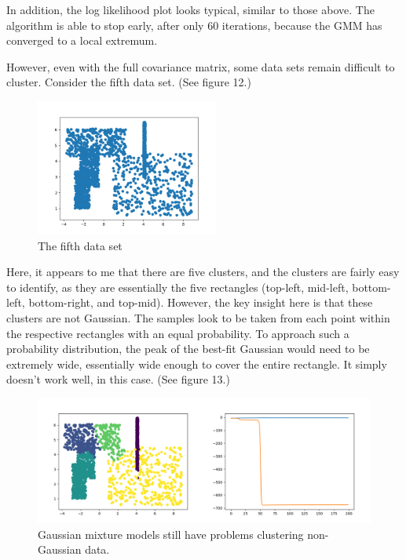 \documentclass{article}
\begin{document}
In addition, the log likelihood plot looks typical, similar to those above. The 
algorithm is able to stop early, after only 60 iterations, because the GMM has 
converged to a local extremum.

However, even with the full covariance matrix, some data sets remain difficult 
to cluster. Consider the fifth data set. (See figure 12.)

\begin{figure}[!ht]
	\centering
	\includegraphics[width=60mm]{figs/gmm_ds4_kn_input.png}
	\caption{The fifth data set}
\end{figure}

Here, it appears to me that there are five clusters, and the clusters are fairly 
easy to identify, as they are essentially the five rectangles (top-left, 
mid-left, bottom-left, bottom-right, and top-mid). However, the key insight here 
is that these clusters are not Gaussian. The samples look to be taken from each 
point within the respective rectangles with an equal probability. To approach 
such a probability distribution, the peak of the best-fit Gaussian would need to 
be extremely wide, essentially wide enough to cover the entire rectangle. It 
simply doesn't work well, in this case. (See figure 13.)

\begin{figure}[!ht]
	\centering
	\includegraphics[width=120mm]{figs/gmm_ds4_k5_covar_plt_ll.png}
	\caption{Gaussian mixture models still have problems clustering 
        non-Gaussian data.}
\end{figure}

~\\
~\\
~\\
~\\
~\\
~\\
~\\
~\\
~\\
~\\
~\\
\end{document}
